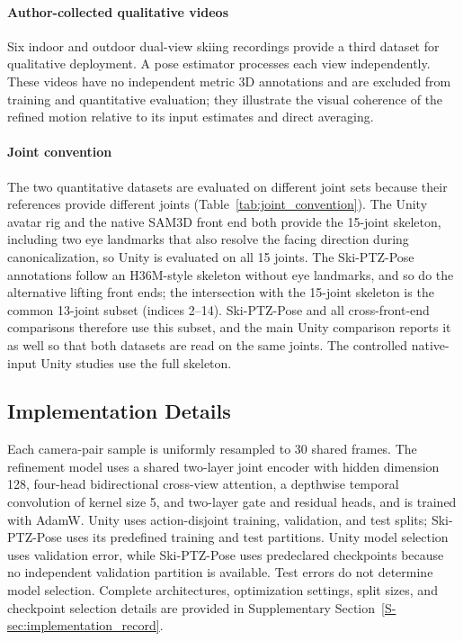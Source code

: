 \documentclass[preprint,12pt]{elsarticle}
\begin{document}
\paragraph{Author-collected qualitative videos}
Six indoor and outdoor dual-view skiing recordings provide a third dataset for qualitative deployment. A pose estimator processes each view independently. These videos have no independent metric 3D annotations and are excluded from training and quantitative evaluation; they illustrate the visual coherence of the refined motion relative to its input estimates and direct averaging.

\paragraph{Joint convention}
The two quantitative datasets are evaluated on different joint sets because their references provide different joints (Table~\ref{tab:joint_convention}). The Unity avatar rig and the native SAM3D front end both provide the 15-joint skeleton, including two eye landmarks that also resolve the facing direction during canonicalization, so Unity is evaluated on all 15 joints. The Ski-PTZ-Pose annotations follow an H36M-style skeleton without eye landmarks, and so do the alternative lifting front ends; the intersection with the 15-joint skeleton is the common 13-joint subset (indices 2--14). Ski-PTZ-Pose and all cross-front-end comparisons therefore use this subset, and the main Unity comparison reports it as well so that both datasets are read on the same joints. The controlled native-input Unity studies use the full skeleton.



\subsection{Implementation Details}
\label{subsec:implementation_details}

Each camera-pair sample is uniformly resampled to 30 shared frames. The refinement model uses a shared two-layer joint encoder with hidden dimension 128, four-head bidirectional cross-view attention, a depthwise temporal convolution of kernel size 5, and two-layer gate and residual heads, and is trained with AdamW. Unity uses action-disjoint training, validation, and test splits; Ski-PTZ-Pose uses its predefined training and test partitions. Unity model selection uses validation error, while Ski-PTZ-Pose uses predeclared checkpoints because no independent validation partition is available. Test errors do not determine model selection. Complete architectures, optimization settings, split sizes, and checkpoint selection details are provided in Supplementary Section~\ref{S-sec:implementation_record}.
\end{document}
